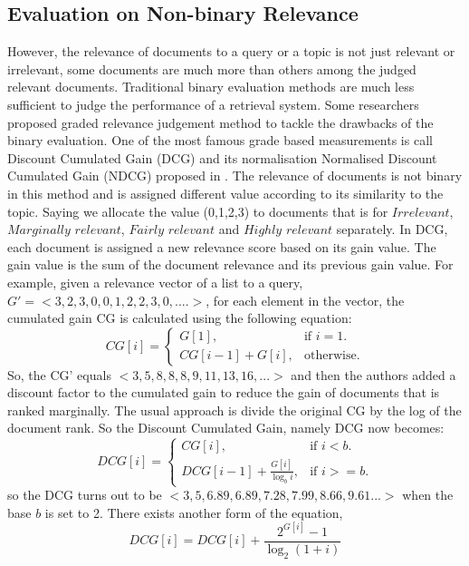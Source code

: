 \subsection{Evaluation on Non-binary Relevance}
However, the relevance of documents to a query or a topic is not just relevant or irrelevant, some documents are much more than others among the judged relevant documents. Traditional binary evaluation  methods are much less sufficient to judge the performance of a retrieval system. Some researchers proposed graded relevance judgement method to tackle the drawbacks of the binary evaluation. One of the most famous grade based measurements is call Discount Cumulated Gain (DCG) and its normalisation Normalised Discount Cumulated Gain (NDCG) proposed in \cite{Jarvelin2002,Kekalainen2005}. The relevance of documents is not binary in this method and is assigned different value according to its similarity to the topic. Saying we allocate the value (0,1,2,3) to documents that is  for $Irrelevant$, $Marginally$ $relevant$, $Fairly$ $relevant$  and $Highly$ $relevant$ separately. In DCG, each document is assigned a new relevance score based on its gain value. The gain value is the sum of the document relevance and its previous gain value. For example, given a relevance vector of a list to a query,
$G'=<3,2,3,0,0,1,2,2,3,0,....>$, for each element in the vector, the cumulated gain CG is calculated using the following equation:
\begin{equation}
\label{eq:cg}
CG[i]=\begin{cases}
G[1],& \text{if $i=1$}.\\
CG[i-1]+G[i], & \text{otherwise}.
\end{cases}
\end{equation}
So, the CG' equals $<3,5,8,8,8,9,11,13,16,...>$ and then the authors added a discount factor to the cumulated gain to reduce the gain of documents that is ranked marginally. The usual approach is divide the original CG by the log of the document rank. So the Discount Cumulated Gain, namely DCG now becomes:
\begin{equation}
DCG[i]=\begin{cases}
CG[i],&\text{if $i<b$}.\\
DCG[i-1]+\frac{G[i]}{\log_bi}, &\text{if $i>=b$}.
\end{cases}
\end{equation} 
so the DCG turns out to be $<3,5,6.89,6.89,7.28,7.99,8.66,9.61...>$ when the base $b$ is set to 2.
There exists another form of the equation, 
 \begin{equation}
DCG[i]=DCG[i]+\frac{2^{G[i]}-1}{\log_2(1+i)}
\end{equation} 

